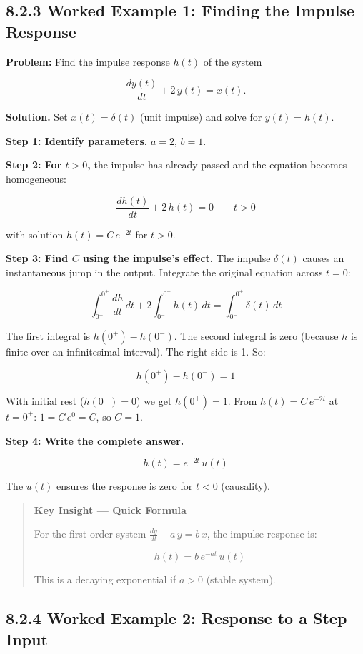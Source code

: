 \documentclass[11pt]{article}
\begin{document}
\subsection*{8.2.3 Worked Example 1: Finding the Impulse Response}

\textbf{Problem:} Find the impulse response $h(t)$ of the system

\[\frac{dy(t)}{dt} + 2\,y(t) = x(t).\]

\textbf{Solution.} Set $x(t) = \delta(t)$ (unit impulse) and solve for $y(t) = h(t)$.

\textbf{Step 1: Identify parameters.} $a = 2$, $b = 1$.

\textbf{Step 2: For $t>0$,} the impulse has already passed and the equation becomes homogeneous:

\[\frac{dh(t)}{dt} + 2\,h(t) = 0\qquad t > 0\]

with solution $h(t) = C\,e^{-2t}$ for $t > 0$.

\textbf{Step 3: Find $C$ using the impulse's effect.} The impulse $\delta(t)$ causes an instantaneous jump in the output. Integrate the original equation across $t=0$:

\[\int_{0^-}^{0^+} \frac{dh}{dt}\,dt + 2\int_{0^-}^{0^+} h(t)\,dt = \int_{0^-}^{0^+} \delta(t)\,dt\]

The first integral is $h(0^+) - h(0^-)$. The second integral is zero (because $h$ is finite over an infinitesimal interval). The right side is 1. So:

\[h(0^+) - h(0^-) = 1\]

With initial rest ($h(0^-) = 0$) we get $h(0^+) = 1$. From $h(t) = C\,e^{-2t}$ at $t = 0^+$: $1 = C\,e^{0} = C$, so $C = 1$.

\textbf{Step 4: Write the complete answer.}

\[\boxed{\;h(t) = e^{-2t}\,u(t)\;}\]

The $u(t)$ ensures the response is zero for $t<0$ (causality).

\begin{quote}
\textbf{Key Insight — Quick Formula}

For the first-order system $\tfrac{dy}{dt} + a\,y = b\,x$, the impulse response is:

\[h(t) = b\,e^{-at}\,u(t)\]

This is a decaying exponential if $a > 0$ (stable system).
\end{quote}

\subsection*{8.2.4 Worked Example 2: Response to a Step Input}
\end{document}
